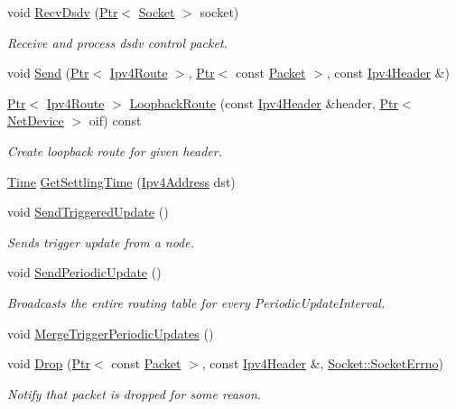 \begin{DoxyCompactItemize}
void \hyperlink{classns3_1_1dsdv_1_1RoutingProtocol_ad27475d64bfd478b57d73f3cc08d4c99}{Recv\+Dsdv} (\hyperlink{classns3_1_1Ptr}{Ptr}$<$ \hyperlink{classns3_1_1Socket}{Socket} $>$ socket)
\begin{DoxyCompactList}\small\item\em Receive and process dsdv control packet. \end{DoxyCompactList}\item 
void \hyperlink{classns3_1_1dsdv_1_1RoutingProtocol_a7b4ba195edb9521642be588fb4f0576e}{Send} (\hyperlink{classns3_1_1Ptr}{Ptr}$<$ \hyperlink{classns3_1_1Ipv4Route}{Ipv4\+Route} $>$, \hyperlink{classns3_1_1Ptr}{Ptr}$<$ const \hyperlink{classns3_1_1Packet}{Packet} $>$, const \hyperlink{classns3_1_1Ipv4Header}{Ipv4\+Header} \&)
\item 
\hyperlink{classns3_1_1Ptr}{Ptr}$<$ \hyperlink{classns3_1_1Ipv4Route}{Ipv4\+Route} $>$ \hyperlink{classns3_1_1dsdv_1_1RoutingProtocol_aadc3f2072721211ad452bcbe49762420}{Loopback\+Route} (const \hyperlink{classns3_1_1Ipv4Header}{Ipv4\+Header} \&header, \hyperlink{classns3_1_1Ptr}{Ptr}$<$ \hyperlink{classns3_1_1NetDevice}{Net\+Device} $>$ oif) const 
\begin{DoxyCompactList}\small\item\em Create loopback route for given header. \end{DoxyCompactList}\item 
\hyperlink{classns3_1_1Time}{Time} \hyperlink{classns3_1_1dsdv_1_1RoutingProtocol_a83244927636fd12b775ebdbe0b334e68}{Get\+Settling\+Time} (\hyperlink{classns3_1_1Ipv4Address}{Ipv4\+Address} dst)
\item 
void \hyperlink{classns3_1_1dsdv_1_1RoutingProtocol_adc414310ddaa5e69520a176c0dac59cc}{Send\+Triggered\+Update} ()
\begin{DoxyCompactList}\small\item\em Sends trigger update from a node. \end{DoxyCompactList}\item 
void \hyperlink{classns3_1_1dsdv_1_1RoutingProtocol_a370e3ca262a505ec0fd30456f82b2aed}{Send\+Periodic\+Update} ()
\begin{DoxyCompactList}\small\item\em Broadcasts the entire routing table for every Periodic\+Update\+Interval. \end{DoxyCompactList}\item 
void \hyperlink{classns3_1_1dsdv_1_1RoutingProtocol_afcf1903d16fb9d303805fbe07986bb06}{Merge\+Trigger\+Periodic\+Updates} ()
\item 
void \hyperlink{classns3_1_1dsdv_1_1RoutingProtocol_ac761f05ae1c90cc3a4a7b9a6e540132e}{Drop} (\hyperlink{classns3_1_1Ptr}{Ptr}$<$ const \hyperlink{classns3_1_1Packet}{Packet} $>$, const \hyperlink{classns3_1_1Ipv4Header}{Ipv4\+Header} \&, \hyperlink{classns3_1_1Socket_ada1328c5ae0c28cb2a982caf8f6d6cca}{Socket\+::\+Socket\+Errno})
\begin{DoxyCompactList}\small\item\em Notify that packet is dropped for some reason. \end{DoxyCompactList}\end{DoxyCompactItemize}
